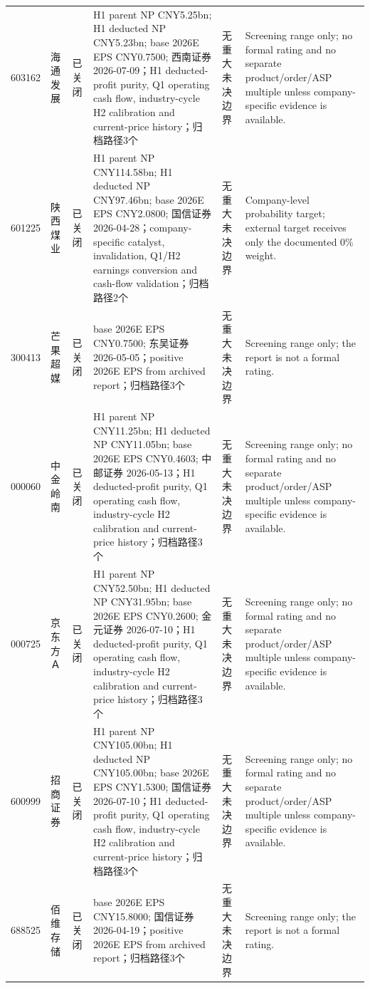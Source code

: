 \begin{longtable}{L{1.00cm}L{1.40cm}L{1.45cm}L{2.85cm}L{2.50cm}L{3.05cm}}
603162 & 海通发展 & 已关闭 & H1 parent NP CNY5.25bn; H1 deducted NP CNY5.23bn; base 2026E EPS CNY0.7500; 西南证券 2026-07-09；H1 deducted-profit purity, Q1 operating cash flow, industry-cycle H2 calibration and current-price history；归档路径3个 & 无重大未决边界 & Screening range only; no formal rating and no separate product/order/ASP multiple unless company-specific evidence is available. \\
601225 & 陕西煤业 & 已关闭 & H1 parent NP CNY114.58bn; H1 deducted NP CNY97.46bn; base 2026E EPS CNY2.0800; 国信证券 2026-04-28；company-specific catalyst, invalidation, Q1/H2 earnings conversion and cash-flow validation；归档路径2个 & 无重大未决边界 & Company-level probability target; external target receives only the documented 0\% weight. \\
300413 & 芒果超媒 & 已关闭 & base 2026E EPS CNY0.7500; 东吴证券 2026-05-05；positive 2026E EPS from archived report；归档路径3个 & 无重大未决边界 & Screening range only; the report is not a formal rating. \\
000060 & 中金岭南 & 已关闭 & H1 parent NP CNY11.25bn; H1 deducted NP CNY11.05bn; base 2026E EPS CNY0.4603; 中邮证券 2026-05-13；H1 deducted-profit purity, Q1 operating cash flow, industry-cycle H2 calibration and current-price history；归档路径3个 & 无重大未决边界 & Screening range only; no formal rating and no separate product/order/ASP multiple unless company-specific evidence is available. \\
000725 & 京东方Ａ & 已关闭 & H1 parent NP CNY52.50bn; H1 deducted NP CNY31.95bn; base 2026E EPS CNY0.2600; 金元证券 2026-07-10；H1 deducted-profit purity, Q1 operating cash flow, industry-cycle H2 calibration and current-price history；归档路径3个 & 无重大未决边界 & Screening range only; no formal rating and no separate product/order/ASP multiple unless company-specific evidence is available. \\
600999 & 招商证券 & 已关闭 & H1 parent NP CNY105.00bn; H1 deducted NP CNY105.00bn; base 2026E EPS CNY1.5300; 国信证券 2026-07-10；H1 deducted-profit purity, Q1 operating cash flow, industry-cycle H2 calibration and current-price history；归档路径3个 & 无重大未决边界 & Screening range only; no formal rating and no separate product/order/ASP multiple unless company-specific evidence is available. \\
688525 & 佰维存储 & 已关闭 & base 2026E EPS CNY15.8000; 国信证券 2026-04-19；positive 2026E EPS from archived report；归档路径3个 & 无重大未决边界 & Screening range only; the report is not a formal rating. \\

\end{longtable}
